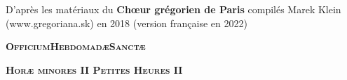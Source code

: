 
\def \feria {A}
\def \feriashort {b}
\def \ohschaptername {c}
\let\feriashort\relax
\let\feria\relax
\clearpage
{}
\begin{center}
D'après les matériaux du \textbf{Chœur grégorien de Paris} 
\linebreak compilés Marek Klein (www.gregoriana.sk) en 2018
\linebreak (version française en 2022)
\end{center}
\thispagestyle{empty}
\clearpage
\begin{center}\huge{\textbf{\textsc{Officium\linebreak Hebdomadæ\linebreak Sanctæ}}}\end{center}

\begin{center}\large{\textbf{\textsc{
Horæ minores II\linebreak
Petites Heures II
}}}\end{center}
\thispagestyle{empty}
\newpage{}



